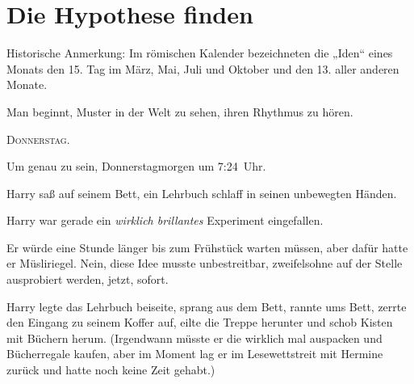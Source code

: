 \chapter{Die Hypothese finden}

\begin{chapterOpeningAuthorNote}
%
Historische Anmerkung: Im römischen Kalender bezeichneten die
„Iden“ eines Monats den 15. Tag im März, Mai, Juli und Oktober und den 13. aller anderen Monate.
\end{chapterOpeningAuthorNote}
\begin{chapterOpeningQuote}
Man beginnt, Muster in der Welt zu sehen, ihren Rhythmus zu hören.
\end{chapterOpeningQuote}

\lettrine{D}{onnerstag}.

\hplettrineextrapara
Um genau zu sein, Donnerstagmorgen um 7:24~Uhr.

Harry saß auf seinem Bett, ein Lehrbuch schlaff in seinen unbewegten Händen.

Harry war gerade ein \emph{wirklich brillantes} Experiment eingefallen.

Er würde eine Stunde länger bis zum Frühstück warten müssen, aber dafür hatte er Müsliriegel. Nein, diese Idee musste unbestreitbar, zweifelsohne auf der Stelle ausprobiert werden, jetzt, sofort.

Harry legte das Lehrbuch beiseite, sprang aus dem Bett, rannte ums Bett, zerrte den Eingang zu seinem Koffer auf, eilte die Treppe herunter und schob Kisten mit Büchern herum. (Irgendwann müsste er die wirklich mal auspacken und Bücherregale kaufen, aber im Moment lag er im Lesewettstreit mit Hermine zurück und hatte noch keine Zeit gehabt.)

